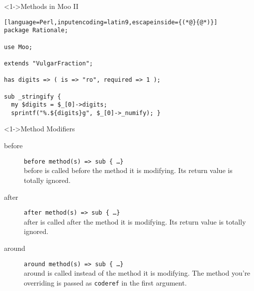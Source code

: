 \documentclass[ngerman,xcolor={table,dvipsnames},scriptsizeer,compress,hyperref={bookmarks,colorlinks}]{beamer}
\begin{document}
\begin{frame}[fragile]

\begin{block}<1->{Methods in Moo II}
\scriptsize
\begin{lstlisting}[language=Perl,inputencoding=latin9,escapeinside={(*@}{@*)}]
package Rationale;

use Moo;

extends "VulgarFraction";

has digits => ( is => "ro", required => 1 );

sub _stringify {
  my $digits = $_[0]->digits;
  sprintf("%.${digits}g", $_[0]->_numify); }

\end{lstlisting}
\end{block}


\end{frame}

\begin{frame}[fragile]

\begin{block}<1->{Method Modifiers}
\begin{description}
\item[before] \texttt{before method(s) => sub \{ \ldots \}} \\
before is called before the method it is modifying. Its return value is totally ignored.
\item[after] \texttt{after method(s) => sub \{ \ldots \}} \\
after is called after the method it is modifying. Its return value is totally ignored.
\item[around] \texttt{around method(s) => sub \{ \ldots \}} \\
around is called instead of the method it is modifying. The method you're overriding is passed as \texttt{coderef} in the first argument.
\end{description}
\end{block}

\begin{itemize}
\end{itemize}

\end{frame}
\end{document}
